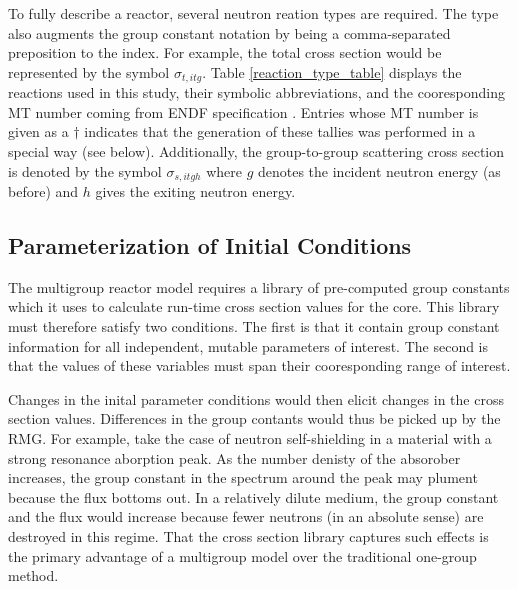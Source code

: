 To fully describe a reactor, several neutron reation types are required.  The type 
also augments the group constant notation by being a comma-separated preposition to 
the index.  For example, the total cross section would be represented by the symbol 
$\sigma_{t,itg}$. Table \ref{reaction_type_table} displays the reactions used in this 
study, their symbolic abbreviations, and the cooresponding MT number coming from ENDF 
specification \cite{MFMT}.  Entries whose MT number is given as a $\dagger$ indicates 
that the generation of these tallies was performed in a special way (see below).
Additionally, the group-to-group scattering cross section is denoted by the symbol
$\sigma_{s,itgh}$ where $g$ denotes the incident neutron energy (as before) and $h$
gives the exiting neutron energy.

\subsection{Parameterization of Initial Conditions}
The multigroup reactor model requires a library of pre-computed group constants which it uses
to calculate run-time cross section values for the core.  This library must therefore satisfy 
two conditions.  The first is that it contain group constant information for all independent, 
mutable parameters of interest.  The second is that the values of these variables must span 
their cooresponding range of interest.  

Changes in the inital parameter conditions would then elicit changes in the cross section 
values. Differences in the group contants would thus be picked up by the RMG.  For example, 
take the case of neutron self-shielding in a material with a strong resonance aborption peak.  
As the number denisty of the absorober increases, the group constant in the spectrum around 
the peak may plument because the flux bottoms out.  In a relatively dilute medium, the group 
constant and the flux would increase because fewer neutrons (in an absolute sense) are destroyed 
in this regime.  That the  cross section library captures such effects is the primary advantage 
of a multigroup model over the traditional one-group method.

